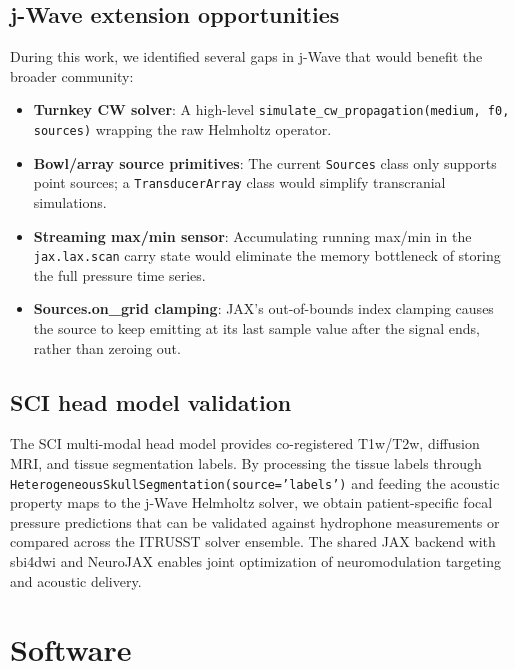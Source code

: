 \documentclass[11pt,a4paper]{article}\usepackage[]{graphicx}\usepackage[]{xcolor}
\begin{document}
\subsection{j-Wave extension opportunities}

During this work, we identified several gaps in j-Wave that would
benefit the broader community:

\begin{itemize}
  \item \textbf{Turnkey CW solver}: A high-level
    \texttt{simulate\_cw\_propagation(medium, f0, sources)} wrapping the
    raw Helmholtz operator.
  \item \textbf{Bowl/array source primitives}: The current
    \texttt{Sources} class only supports point sources; a
    \texttt{TransducerArray} class would simplify transcranial
    simulations.
  \item \textbf{Streaming max/min sensor}: Accumulating running
    max/min in the \texttt{jax.lax.scan} carry state would eliminate the
    memory bottleneck of storing the full pressure time series.
  \item \textbf{Sources.on\_grid clamping}: JAX's out-of-bounds index
    clamping causes the source to keep emitting at its last sample value
    after the signal ends, rather than zeroing out.
\end{itemize}

\subsection{SCI head model validation}

The SCI multi-modal head model provides co-registered T1w/T2w, diffusion
MRI, and tissue segmentation labels. By processing the tissue labels
through \texttt{HeterogeneousSkullSegmentation(source='labels')} and
feeding the acoustic property maps to the j-Wave Helmholtz solver, we
obtain patient-specific focal pressure predictions that can be validated
against hydrophone measurements or compared across the ITRUSST solver
ensemble. The shared JAX backend with sbi4dwi and NeuroJAX enables
joint optimization of neuromodulation targeting and acoustic delivery.

\section{Software}
\label{sec:software}
\end{document}

